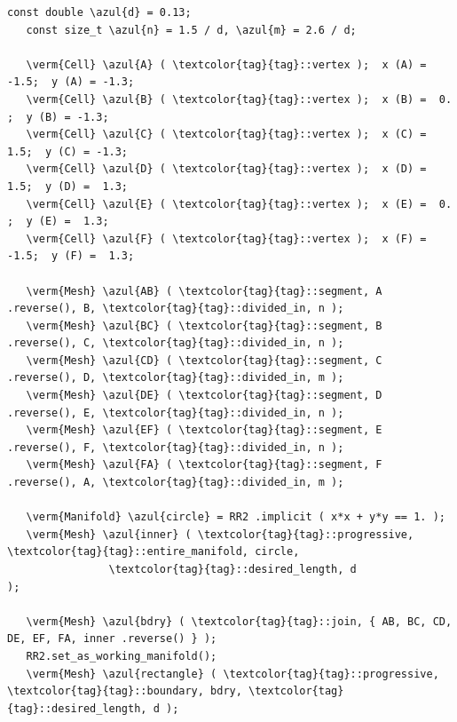 \begin{Verbatim}[commandchars=\\\{\},formatcom=\small\tt,frame=single,
   label=parag-\ref{\numb section 7.\numb parag 18}.cpp,rulecolor=\color{coment},
   baselinestretch=0.94,framesep=2mm                                             ]
   const double \azul{d} = 0.13;
   const size_t \azul{n} = 1.5 / d, \azul{m} = 2.6 / d;

   \verm{Cell} \azul{A} ( \textcolor{tag}{tag}::vertex );  x (A) = -1.5;  y (A) = -1.3;
   \verm{Cell} \azul{B} ( \textcolor{tag}{tag}::vertex );  x (B) =  0. ;  y (B) = -1.3;
   \verm{Cell} \azul{C} ( \textcolor{tag}{tag}::vertex );  x (C) =  1.5;  y (C) = -1.3;
   \verm{Cell} \azul{D} ( \textcolor{tag}{tag}::vertex );  x (D) =  1.5;  y (D) =  1.3;
   \verm{Cell} \azul{E} ( \textcolor{tag}{tag}::vertex );  x (E) =  0. ;  y (E) =  1.3;
   \verm{Cell} \azul{F} ( \textcolor{tag}{tag}::vertex );  x (F) = -1.5;  y (F) =  1.3;

   \verm{Mesh} \azul{AB} ( \textcolor{tag}{tag}::segment, A .reverse(), B, \textcolor{tag}{tag}::divided_in, n );
   \verm{Mesh} \azul{BC} ( \textcolor{tag}{tag}::segment, B .reverse(), C, \textcolor{tag}{tag}::divided_in, n );
   \verm{Mesh} \azul{CD} ( \textcolor{tag}{tag}::segment, C .reverse(), D, \textcolor{tag}{tag}::divided_in, m );
   \verm{Mesh} \azul{DE} ( \textcolor{tag}{tag}::segment, D .reverse(), E, \textcolor{tag}{tag}::divided_in, n );
   \verm{Mesh} \azul{EF} ( \textcolor{tag}{tag}::segment, E .reverse(), F, \textcolor{tag}{tag}::divided_in, n );
   \verm{Mesh} \azul{FA} ( \textcolor{tag}{tag}::segment, F .reverse(), A, \textcolor{tag}{tag}::divided_in, m );

   \verm{Manifold} \azul{circle} = RR2 .implicit ( x*x + y*y == 1. );
   \verm{Mesh} \azul{inner} ( \textcolor{tag}{tag}::progressive, \textcolor{tag}{tag}::entire_manifold, circle,
                \textcolor{tag}{tag}::desired_length, d                         );

   \verm{Mesh} \azul{bdry} ( \textcolor{tag}{tag}::join, { AB, BC, CD, DE, EF, FA, inner .reverse() } );
   RR2.set_as_working_manifold();
   \verm{Mesh} \azul{rectangle} ( \textcolor{tag}{tag}::progressive, \textcolor{tag}{tag}::boundary, bdry, \textcolor{tag}{tag}::desired_length, d );
\end{Verbatim}

